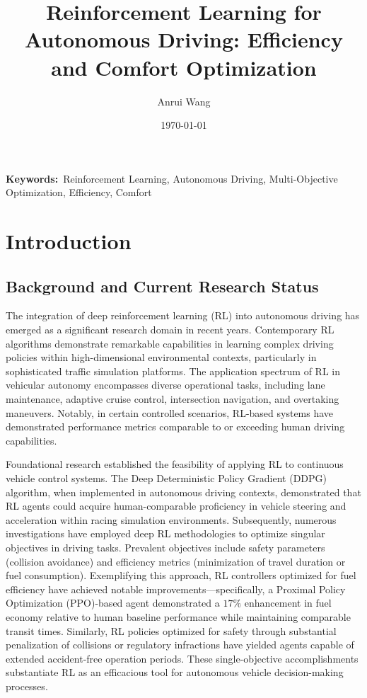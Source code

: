 \documentclass[12pt,a4paper]{article}
\title{\Large Reinforcement Learning for Autonomous Driving: Efficiency and Comfort Optimization}
\author{Anrui Wang}
\date{\today}
\begin{document}
\sloppy

\maketitle

\begin{abstract}
    
\end{abstract}

\textbf{Keywords:}~Reinforcement Learning, Autonomous Driving, Multi-Objective Optimization, Efficiency, Comfort\hfill\null

\section{Introduction}

\subsection{Background and Current Research Status}
The integration of deep reinforcement learning (RL) into autonomous driving has emerged as a significant research domain in recent years. Contemporary RL algorithms demonstrate remarkable capabilities in learning complex driving policies within high-dimensional environmental contexts, particularly in sophisticated traffic simulation platforms. The application spectrum of RL in vehicular autonomy encompasses diverse operational tasks, including lane maintenance, adaptive cruise control, intersection navigation, and overtaking maneuvers. Notably, in certain controlled scenarios, RL-based systems have demonstrated performance metrics comparable to or exceeding human driving capabilities\cite{jin2025}.

Foundational research established the feasibility of applying RL to continuous vehicle control systems. The Deep Deterministic Policy Gradient (DDPG) algorithm, when implemented in autonomous driving contexts, demonstrated that RL agents could acquire human-comparable proficiency in vehicle steering and acceleration within racing simulation environments\cite{zhu2020}. Subsequently, numerous investigations have employed deep RL methodologies to optimize singular objectives in driving tasks. Prevalent objectives include safety parameters (collision avoidance) and efficiency metrics (minimization of travel duration or fuel consumption). Exemplifying this approach, RL controllers optimized for fuel efficiency have achieved notable improvements—specifically, a Proximal Policy Optimization (PPO)-based agent demonstrated a $17\%$ enhancement in fuel economy relative to human baseline performance while maintaining comparable transit times\cite{zhu2021}. Similarly, RL policies optimized for safety through substantial penalization of collisions or regulatory infractions have yielded agents capable of extended accident-free operation periods. These single-objective accomplishments substantiate RL as an efficacious tool for autonomous vehicle decision-making processes\cite{survey2023}.
\end{document}
